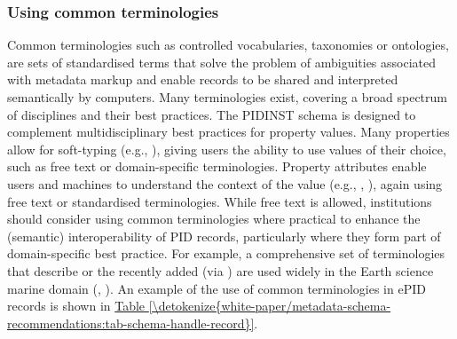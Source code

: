 \documentclass[a4paper,10pt,english]{sphinxmanual}
\begin{document}
\subsubsection{Using common terminologies}
\label{\detokenize{white-paper/metadata-schema-recommendations:using-common-terminologies}}\label{\detokenize{white-paper/metadata-schema-recommendations:pidinst-metadata-schema-terminologies}}
Common terminologies such as controlled vocabularies, taxonomies or
ontologies, are sets of standardised terms that solve the problem of
ambiguities associated with metadata markup and enable records to be
shared and interpreted semantically by computers. Many terminologies
exist, covering a broad spectrum of disciplines and their best
practices. The PIDINST schema is designed to complement
multidisciplinary best practices for property values. Many properties
allow for soft-typing (e.g., ), giving users the ability to
use values of their choice, such as free text or domain-specific
terminologies. Property attributes enable users and machines to
understand the context of the value (e.g., ,
), again using free text or standardised
terminologies. While free text is allowed, institutions should consider
using common terminologies where practical to enhance the (semantic)
interoperability of PID records, particularly where they form part of
domain-specific best practice. For example, a comprehensive set of
terminologies that describe  or the recently added
 (via ) are used widely in the Earth science
marine domain (,
).
An example of the use of common terminologies in ePID records is shown
in \hyperref[\detokenize{white-paper/metadata-schema-recommendations:tab-schema-handle-record}]{Table \ref{\detokenize{white-paper/metadata-schema-recommendations:tab-schema-handle-record}}}.
\end{document}
